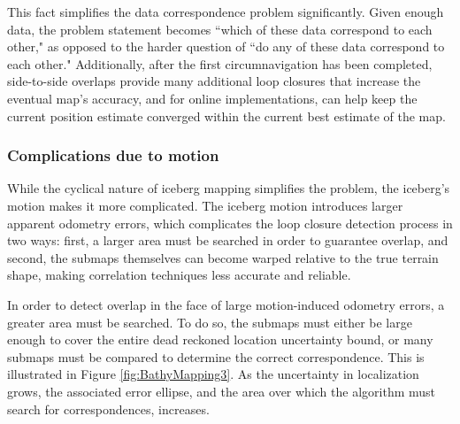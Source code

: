 This fact simplifies the data correspondence problem significantly. Given enough data, the problem statement becomes ``which of these data correspond to each other," as opposed to the harder question of ``do any of these data correspond to each other." Additionally, after the first circumnavigation has been completed, side-to-side overlaps provide many additional loop closures that increase the eventual map's accuracy, and for online implementations, can help keep the current position estimate converged within the current best estimate of the map.


\subsubsection{Complications due to motion} 

While the cyclical nature of iceberg mapping simplifies the problem, the iceberg's motion makes it more complicated. The iceberg motion introduces larger apparent odometry errors, which complicates the loop closure detection process in two ways: first, a larger area must be searched in order to guarantee overlap, and second, the submaps themselves can become warped relative to the true terrain shape, making correlation techniques less accurate and reliable.


In order to detect overlap in the face of large motion-induced odometry errors, a greater area must be searched. To do so, the submaps must either be large enough to cover the entire dead reckoned location uncertainty bound, or many submaps must be compared to determine the correct correspondence. This is illustrated in Figure \ref{fig:BathyMapping3}. As the uncertainty in localization grows, the associated error ellipse, and the area over which the algorithm must search for correspondences, increases.

